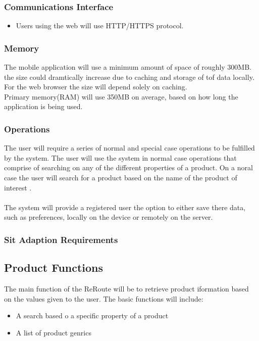 \documentclass[a4paper,10pt]{article}
\begin{document}
            \subsubsection{Communications Interface}
	 \begin{itemize}
	    \item Users using the web will use HTTP/HTTPS protocol.
	    \end{itemize}
            \subsubsection{Memory}
	    {The mobile application will use a minimum amount of space of roughly 300MB.  the size could dramtically increase due to caching and storage of tof data locally. For the web browser the size will depend solely on caching. \\
Primary memory(RAM) will use 350MB on average, based on how long the application is being used.}
            \subsubsection{Operations}
            	{The user will require a series of normal and special case operations to be fulfilled by the system. The user will use the system in normal case operations that comprise of searching on any of the different properties of a product. On a noral case the user will search for a product based on the name of the product of interest .\\\\
            	The system will provide a registered user the option to either save there data, such as preferences, locally on the device or remotely on the server.}
           \subsubsection{Sit Adaption Requirements}
        
		\subsection{Product Functions} {The main function of the ReRoute will be to retrieve product iformation based on the values given to the user. The basic functions will include:  }
	\begin{itemize}
  		\item A search based o a specific property of a product
		\item A list of product genrics
	\end{itemize}
\end{document}
